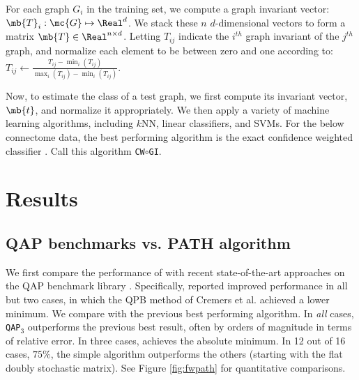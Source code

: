 \documentclass[10pt,journal,cspaper,compsoc]{IEEEtran}
\begin{document}
For each graph $G_i$ in the training set, we compute a graph invariant vector: $\mb{T}_i: \mc{G} \mapsto \Real^d$.  We stack these $n$ $d$-dimensional vectors to form a matrix $\mb{T} \in \Real^{n \times d}$.  Letting $T_{ij}$ indicate the $i^{th}$ graph invariant of the $j^{th}$ graph, and normalize each element to be between zero and one according to:  $T_{ij} \leftarrow \frac{T_{ij} - \min_i (T_{ij})}{\max_i(T_{ij}) - \min_i(T_{ij})}$.

Now, to estimate the class of a test graph, we first compute its invariant vector, $\mb{t}$, and normalize it appropriately.  We then apply a variety of machine learning algorithms, including $k$NN, linear classifiers, and SVMs.  For the below connectome data, the best performing algorithm is the exact confidence weighted classifier \cite{Crammer2008}.  Call this algorithm \texttt{CW}$\circ$\texttt{GI}.











\section{Results}

\subsection{QAP benchmarks vs. PATH algorithm}

We first compare the performance of \qapn with recent state-of-the-art approaches on the QAP benchmark library \cite{Burkard1997}.  Specifically, \cite{Zaslavskiy2009} reported improved performance in all but two cases, in which the QPB method of Cremers et al. \cite{Schellewald2001} achieved a lower minimum.  We compare \qapn with the previous best performing algorithm.  In \emph{all} cases, \texttt{QAP}$_3$ outperforms the previous best result, often by orders of magnitude in terms of relative error. In three cases, \qapb achieves the absolute minimum.  In 12 out of 16 cases, $75\%$, the simple \qapa algorithm outperforms the others (starting with the flat doubly stochastic matrix).  See Figure \ref{fig:fwpath} for quantitative comparisons.
\end{document}
